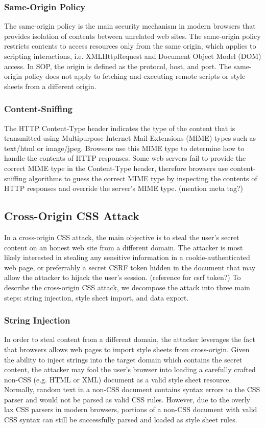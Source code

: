 \documentclass{acm_proc_article-sp}
\begin{document}
\subsubsection{Same-Origin Policy}
The same-origin policy\cite{mozillasameorigin} is the main security mechanism in modern browsers that provides isolation of contents between unrelated web sites. The same-origin policy restricts contents to access resources only from the same origin, which applies to scripting interactions, i.e. XMLHttpRequest and Document Object Model (DOM)\cite{dom} access. In SOP, the origin is defined as the protocol, host, and port. The same-origin policy does not apply to fetching and executing remote scripts or style sheets from a different origin.

\subsubsection{Content-Sniffing}
The HTTP Content-Type header indicates the type of the content that is transmitted using Multipurpose Internet Mail Extensions (MIME)\cite{mime} types such as text/html or image/jpeg. Browsers use this MIME type to determine how to handle the contents of HTTP responses. Some web servers fail to provide the correct MIME type in the Content-Type header, therefore browsers use content-sniffing algorithms to guess the correct MIME type by inspecting the contents of HTTP responses and override the server's MIME type.
(mention meta tag?)

\subsection{Cross-Origin CSS Attack}
In a cross-origin CSS attack, the main objective is to steal the user's secret content on an honest web site from a different domain. The attacker is most likely interested in stealing any sensitive information in a cookie-authenticated web page, or preferrably a secret CSRF token hidden in the document that may allow the attacker to hijack the user's session. 
(reference for csrf token?)
To describe the cross-origin CSS attack, we decompose the attack into three main steps: string injection, style sheet import, and data export.

\subsubsection{String Injection}
In order to steal content from a different domain, the attacker leverages the fact that browsers allows web pages to import style sheets from cross-origin. Given the ability to inject strings into the target domain which contains the secret content, the attacker may fool the user's browser into loading a carefully crafted non-CSS (e.g. HTML or XML) document as a valid style sheet resource. Normally, random text in a non-CSS document contains syntax errors to the CSS parser and would not be parsed as valid CSS rules. However, due to the overly lax CSS parsers in modern browsers, portions of a non-CSS document with valid CSS syntax can still be successfully parsed and loaded as style sheet rules.
\end{document}
